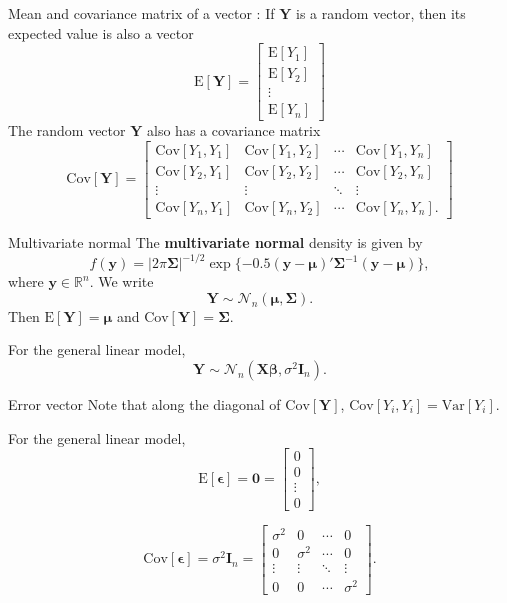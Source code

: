 \documentclass{beamer}
\newcommand{\E}{\mathrm{E}}
\newcommand{\Var}{\mathrm{Var}}
\newcommand{\Cov}{\mathrm{Cov}}
\begin{document}
\begin{frame}{Mean and covariance matrix of a vector}
: If $\mathbf{Y}$ is a random vector, then its \alert{expected value} is also a vector
$$
\E[\mathbf{Y}]=\begin{bmatrix}
\E[Y_1]\\\E[Y_2]\\\vdots\\\E[Y_n]
\end{bmatrix}
$$
The random vector $\mathbf{Y}$ also has a \alert{covariance matrix}
$$
\Cov[\mathbf{Y}]=\begin{bmatrix}
\Cov[Y_1,Y_1] & \Cov[Y_1,Y_2] & \cdots & \Cov[Y_1,Y_n]\\
\Cov[Y_2,Y_1] & \Cov[Y_2,Y_2] & \cdots & \Cov[Y_2,Y_n]\\
\vdots & \vdots & \ddots & \vdots\\
\Cov[Y_n,Y_1] & \Cov[Y_n, Y_2] & \cdots & \Cov[Y_n, Y_n].
\end{bmatrix}
$$
\end{frame}

\begin{frame}{Multivariate normal}
The \textbf{multivariate normal} density is given by
$$
f(\mathbf{y})=|2\pi\mathbf{\Sigma}|^{-1/2}\exp\{-0.5(\mathbf{y}-\boldsymbol\mu)'\mathbf\Sigma^{-1}(\mathbf{y}-\boldsymbol\mu)\},$$
where $\mathbf{y}\in\mathbb{R}^n$. We write
$$
\mathbf{Y}\sim\mathcal{N}_n(\boldsymbol\mu, \mathbf\Sigma).
$$
Then $\E[\mathbf{Y}]=\boldsymbol\mu$ and $\Cov[\mathbf{Y}]=\mathbf\Sigma$.
\vspace{10pt}

For the general linear model,
$$
\mathbf{Y}\sim\mathcal{N}_n(\mathbf{X}\boldsymbol\beta,\sigma^2\mathbf{I}_n).
$$
\end{frame}

\begin{frame}{Error vector}
Note that along the diagonal of $\Cov[\mathbf{Y}]$, $\Cov[Y_i, Y_i]=\Var[Y_i]$.
\vspace{10pt}

For the general linear model,
$$
\E[\boldsymbol\epsilon]=\mathbf{0}=\begin{bmatrix}
0\\0\\\vdots\\0
\end{bmatrix},
$$

$$
\Cov[\boldsymbol\epsilon]=\sigma^2\mathbf{I}_n=\begin{bmatrix}
\sigma^2 & 0 & \cdots & 0\\
0 & \sigma^2 & \cdots & 0\\
\vdots & \vdots & \ddots & \vdots\\
0 & 0 & \cdots & \sigma^2
\end{bmatrix}.
$$
\end{frame}
\end{document}
